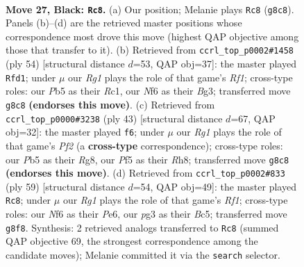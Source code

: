 \documentclass[11pt]{article}
\begin{document}
\clearpage

\begin{figure}[p]\centering
\begin{subfigure}{0.46\textwidth}\centering
\resizebox{\linewidth}{!}{%
\newchessgame
\chessboard[
  setfen={6rk/p1bb2pp/P4n2/1p3p2/1n3P2/1P2PBP1/8/RNB2RK1 b - - 3 27},
  showmover=false,
  pgfstyle=straightmove, color=movearrow, markmove={g8-c8}
]}
\caption{}
\end{subfigure}\hfill
\begin{subfigure}{0.46\textwidth}\centering
\resizebox{\linewidth}{!}{%
\newchessgame
\chessboard[
  setfen={r2b1r1k/6p1/1n2pp1p/pP6/3PP1N1/3p2BP/5PP1/2R2RK1 w - - 0 28},
  showmover=false,
  pgfstyle=straightmove, color=movearrow, markmove={f1-d1}
]}
\caption{}
\end{subfigure}
\\[4pt]
\begin{subfigure}{0.46\textwidth}\centering
\resizebox{\linewidth}{!}{%
\newchessgame
\chessboard[
  setfen={6rr/p3kppp/N1Bb4/8/1p1p1P1P/4n1P1/PP2P3/2R1K2R b - - 0 22},
  showmover=false,
  pgfstyle=straightmove, color=movearrow, markmove={f7-f6}
]}
\caption{}
\end{subfigure}\hfill
\begin{subfigure}{0.46\textwidth}\centering
\resizebox{\linewidth}{!}{%
\newchessgame
\chessboard[
  setfen={5rk1/5p1p/1p2p3/pPb1P1p1/5n2/2P2B1P/2P3P1/R3R2K b - - 1 30},
  showmover=false,
  pgfstyle=straightmove, color=movearrow, markmove={f8-c8}
]}
\caption{}
\end{subfigure}
\caption{\textbf{Move 27, Black: \texttt{Rc8}.} (a) Our position; Melanie plays \texttt{Rc8} (\texttt{g8c8}). Panels (b)--(d) are the retrieved master positions whose correspondence most drove this move (highest QAP objective among those that transfer to it). (b) Retrieved from \texttt{ccrl\_top\_p0002\#1458} (ply 54) [structural distance $d$=53, QAP obj=37]: the master played \texttt{Rfd1}; under $\mu$ our \emph{Rg1} plays the role of that game's \emph{Rf1}; cross-type roles: our \emph{P}b5 as their \emph{R}c1, our \emph{N}f6 as their \emph{B}g3; transferred move \texttt{g8c8} \textbf{(endorses this move)}. (c) Retrieved from \texttt{ccrl\_top\_p0000\#3238} (ply 43) [structural distance $d$=67, QAP obj=32]: the master played \texttt{f6}; under $\mu$ our \emph{Rg1} plays the role of that game's \emph{Pf2} (a \textbf{cross-type} correspondence); cross-type roles: our \emph{P}b5 as their \emph{R}g8, our \emph{P}f5 as their \emph{R}h8; transferred move \texttt{g8c8} \textbf{(endorses this move)}. (d) Retrieved from \texttt{ccrl\_top\_p0002\#833} (ply 59) [structural distance $d$=54, QAP obj=49]: the master played \texttt{Rc8}; under $\mu$ our \emph{Rg1} plays the role of that game's \emph{Rf1}; cross-type roles: our \emph{N}f6 as their \emph{P}e6, our \emph{p}g3 as their \emph{B}c5; transferred move \texttt{g8f8}. Synthesis: 2 retrieved analogs transferred to \texttt{Rc8} (summed QAP objective 69, the strongest correspondence among the candidate moves); Melanie committed it via the \texttt{search} selector.}
\label{fig:thought-m53}
\end{figure}
\end{document}
